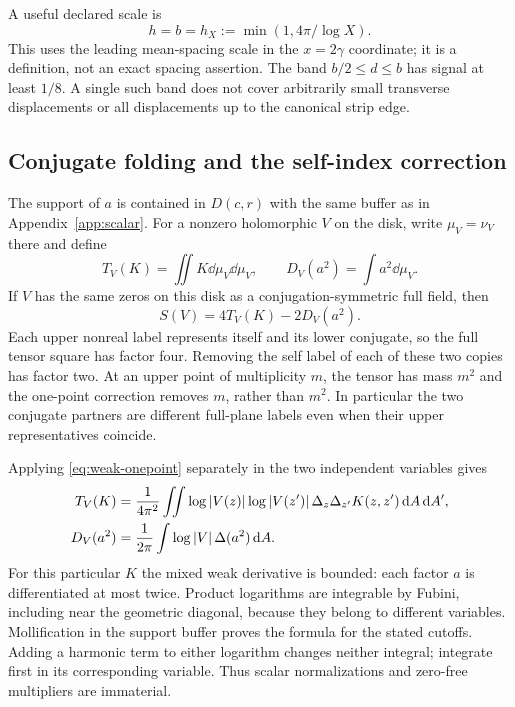 A useful declared scale is
\begin{equation}\label{eq:matched-scale}
 h=b=h_X:=\min(1,4\pi/\log X).
\end{equation}
This uses the leading mean-spacing scale in the $x=2\gamma$
coordinate; it is a definition, not an exact spacing assertion.
The band $b/2\le d\le b$ has signal at least $1/8$.
A single such band does not cover arbitrarily small transverse
displacements or all displacements up to the canonical strip edge.

\subsection{Conjugate folding and the self-index correction}

The support of $a$ is contained in $D(c,r)$ with the same buffer as
in Appendix~\ref{app:scalar}. For a nonzero holomorphic $V$ on
the disk, write $\mu_V=\nu_V$ there and define
\[
 T_V(K)=\iint K\dd\mu_V\dd\mu_V,\qquad
 D_V(a^2)=\int a^2\dd\mu_V .
\]
If $V$ has the same zeros on this disk as a conjugation-symmetric
full field, then
\begin{equation}\label{eq:folded-pair}
 S(V)=4T_V(K)-2D_V(a^2).
\end{equation}
Each upper nonreal label represents itself and its lower conjugate,
so the full tensor square has factor four. Removing the self label
of each of these two copies has factor two. At an upper point of
multiplicity $m$, the tensor has mass $m^2$ and the one-point
correction removes $m$, rather than $m^2$. In particular the two
conjugate partners are different full-plane labels even when their
upper representatives coincide.

Applying \eqref{eq:weak-onepoint} separately in the two independent
variables gives
\begin{align}
 T_V(K)&=\frac1{4\pi^2}
  \iint\log|V(z)|\log|V(z')|\,
       \Delta_z\Delta_{z'}K(z,z')\,\mathrm d A\,\mathrm d A',\label{eq:pair-log}\\
 D_V(a^2)&=\frac1{2\pi}
       \int\log|V|\,\Delta(a^2)\,\mathrm d A .\notag
\end{align}
For this particular $K$ the mixed weak derivative is bounded:
each factor $a$ is differentiated at most twice. Product logarithms
are integrable by Fubini, including near the geometric diagonal,
because they belong to different variables. Mollification in the
support buffer proves the formula for the stated cutoffs.
Adding a harmonic term to either logarithm changes neither integral;
integrate first in its corresponding variable. Thus scalar
normalizations and zero-free multipliers are immaterial.

